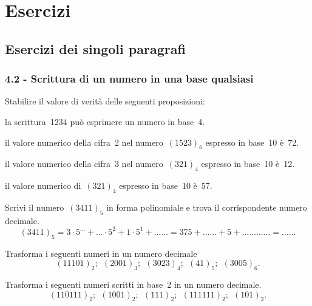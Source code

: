 \section{Esercizi}
\subsection{Esercizi dei singoli paragrafi}
\subsubsection*{4.2 - Scrittura di un numero in una base qualsiasi}

\begin{esercizio}
\label{ese:4.1}
Stabilire il valore di verità delle seguenti proposizioni:
\begin{enumeratea}
\TabPositions{12cm}
\item la scrittura~1234 può esprimere un numero in base~4. \tab\boxV\quad\boxF
\item il valore numerico della cifra~2 nel numero~$(1523)_{6}$ espresso in base~10 è~72.\tab\boxV\quad\boxF
\item il valore numerico della cifra~3 nel numero~$(321)_{4}$ espresso in base~10 è~12. \tab\boxV\quad\boxF
\item il valore numerico di~$(321)_{4}$ espresso in base~10 è~57. \tab\boxV\quad\boxF
\end{enumeratea}
\end{esercizio}

\begin{esercizio}
\label{ese:4.2}
Scrivi il numero~$(3411)_{5}$ in forma polinomiale e trova il corrispondente numero decimale.
\[
(3411)_{5}=3\cdot 5^{\ldots }+\ldots \cdot 5^{2}+1\cdot5^{1}+\ldots\ldots =375+\ldots\ldots +5+\ldots%
\ldots\ldots\ldots =\ldots\ldots\]
\end{esercizio}

\begin{esercizio}
\label{ese:4.3}
Trasforma i seguenti numeri in un numero
decimale
\[(11101)_{2};\:\:(2001)_{3};\:\:(3023)_{4};\:\:(41)_{5};\:\:(3005)_{6}.\]
\end{esercizio}

\begin{esercizio}
\label{ese:4.4}
Trasforma i seguenti numeri scritti in base~2 in un numero decimale.
\[(110111)_{2};\:\:(1001)_{2};\:\:(111)_{2};\:\:(111111)_{2};\:\:(101)_{2}.\]
\end{esercizio}

